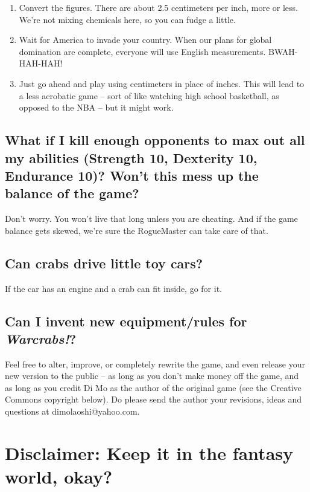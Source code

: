 \documentclass[a4paper,10pt]{article}
\begin{document}
\begin{enumerate}
 \item Convert the figures. There are about 2.5 centimeters per inch, more or less. We're not mixing chemicals here, so you can fudge a little.
 \item Wait for America to invade your country. When our plans for global domination are complete, everyone will use English measurements. BWAH-HAH-HAH!
 \item Just go ahead and play using centimeters in place of inches. This will lead to a less acrobatic game -- sort of like watching high school basketball, as opposed to the NBA -- but it might work.
\end{enumerate}

\subsection*{What if I kill enough opponents to max out all my abilities (Strength 10, Dexterity 10, Endurance 10)? Won't this mess up the balance of the game?}
\label{sec:Faq2}

Don't worry. You won't live that long unless you are cheating. And if the game balance gets skewed, we're sure the RogueMaster can take care of that.

\subsection*{Can crabs drive little toy cars?}
\label{sec:Faq3}

If the car has an engine and a crab can fit inside, go for it.

\subsection*{Can I invent new equipment/rules for \textit{Warcrabs!}?}
\label{sec:Faq4}

Feel free to alter, improve, or completely rewrite the game, and even release your new
version to the public -- as long as you don't make money off the game, and as long as
you credit Di Mo as the author of the original game (see the Creative Commons
copyright below). Do please send the author your revisions, ideas and questions at
dimolaoshi@yahoo.com.

\section*{Disclaimer: Keep it in the fantasy world, okay?}
\label{sec:Disclaimer}
\end{document}
